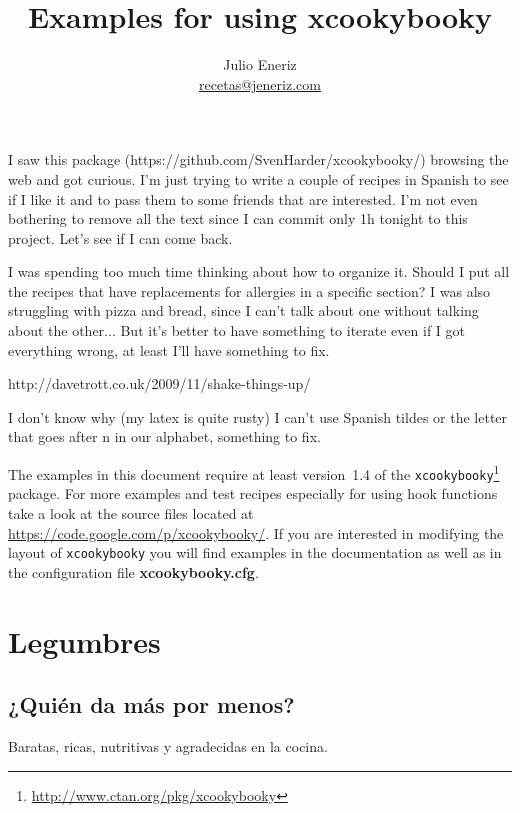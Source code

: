 \documentclass[%
a4paper,
twoside,
14pt
]{book}
\begin{document}
\title{Examples for using \textbf{xcookybooky}}
\author{Julio Eneriz\\ \href{mailto:recetas@jeneriz.com}{recetas@jeneriz.com}}
\maketitle

\noindent I saw this package (https://github.com/SvenHarder/xcookybooky/) browsing the web and got curious. I'm just trying to write a couple of recipes in Spanish to see if I like it and to pass them to some friends that are interested. I'm not even bothering to remove all the text since I can commit only 1h tonight to this project. Let's see if I can come back.

\noindent I was spending too much time thinking about how to organize it. Should I put all the recipes that have replacements for allergies in a specific section? I was also struggling with pizza and bread, since I can't talk about one without talking about the other... But it's better to have something to iterate even if I got everything wrong, at least I'll have something to fix.

http://davetrott.co.uk/2009/11/shake-things-up/

\noindent I don't know why (my latex is quite rusty) I can't use Spanish tildes or the letter that goes after n in our alphabet, something to fix.

    \noindent The examples in this document require at least version~1.4 of the \texttt{xcookybooky}\footnote{\url{http://www.ctan.org/pkg/xcookybooky}} package. For more examples and test recipes especially for using hook functions take a look at the source files located at \url{https://code.google.com/p/xcookybooky/}. If you are interested in modifying the layout of \texttt{xcookybooky} you will find examples in the documentation as well as in the configuration file \textbf{xcookybooky.cfg}.

\tableofcontents

\vspace{5em}

\chapter{Legumbres}
\section{¿Quién da más por menos?}
Baratas, ricas, nutritivas y agradecidas en la cocina.
\end{document}

